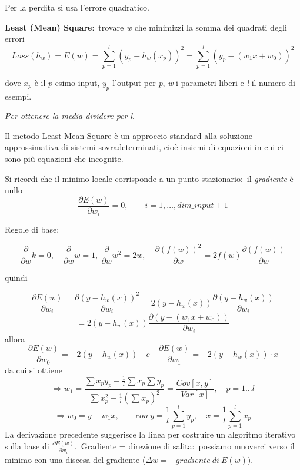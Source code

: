 \noindent Per la perdita si usa l'errore quadratico.

\begin{flushleft}
	\textbf{Least (Mean) Square}:\ trovare \textit{w} che minimizzi la somma dei quadrati degli errori
	\[
		Loss(h_w) = E(w) = \sum_{p=1}^l(y_p - h_w(x_p))^2 = \sum_{p=1}^l(y_p -(w_1x + w_0))^2
	\]

	dove $x_p$ è il $p$-esimo input, $y_p$ l'output per \textit{p}, \textit{w} i parametri liberi e \textit{l} il numero di esempi.

	\textit{Per ottenere la media dividere per l}.
\end{flushleft}

\noindent Il metodo Least Mean Square è un approccio standard alla soluzione approssimativa di sistemi sovradeterminati, cioè insiemi di equazioni in cui ci sono più equazioni che incognite.

\begin{flushleft}
	Si ricordi che il minimo locale corrisponde a un punto stazionario:\ il \textit{gradiente} è nullo
	\[
		\frac{\partial E(w)}{\partial w_i} = 0, \qquad i=1, \dots, dim\_input+1
	\]
\end{flushleft}

\noindent Regole di base:

\[
	\frac{\partial}{\partial w}k = 0,\quad \frac{\partial}{\partial w}w = 1,\ \frac{\partial}{\partial w}w^2 = 2w,\quad \frac{\partial(f(w))^2}{\partial w} = 2f(w) \frac{\partial(f(w))}{\partial w}
\]

\noindent quindi

\[	\frac{\partial E(w)}{\partial w_i} = \frac{\partial(y-h_w(x))^2}{\partial w_i} = 2(y-h_w(x)) \frac{\partial(y-h_w(x))}{\partial w_i}\]
\[ = 2(y-h_w(x)) \frac{\partial (y-(w_1 x + w_0))}{\partial w_i} \]
allora
\[ \frac{\partial E(w)}{\partial w_0} = -2(y-h_w(x))\quad e \quad \frac{\partial E(w)}{\partial w_1} = -2(y -h_w(x)) \cdot x \]
da cui si ottiene
\[ \Rightarrow w_1 = \frac{\sum x_py_p - \frac{1}{l}\sum x_p \sum y_p}{\sum x^2_p - \frac{1}{l} (\sum x_p)^2} = \frac{\mathit{Cov}[x,y]}{\mathit{Var}[x]}, \quad p =1 \dots l\]
\[\Rightarrow w_0 = \bar{y} - w_1 \bar{x}, \qquad con\ \bar{y} = \frac{1}{l} \sum_{p=1}^{l}y_p, \quad \bar{x} = \frac{1}{l} \sum_{p=1}^{l}x_p\]
La derivazione precedente suggerisce la linea per costruire un algoritmo itera\-tivo sulla base di $\frac{\partial E(w)}{\partial w_i}$.\
Gradiente = direzione di salita:\ possiamo muoverci verso il minimo con una discesa del gradiente ($\Delta w = - \mathit{gradiente\ di}\ E (w))$.\

